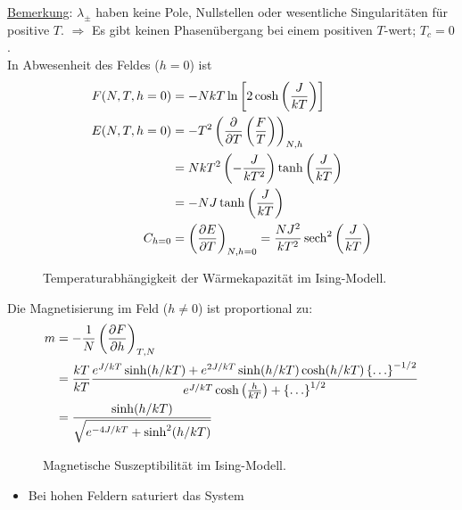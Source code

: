 \begin{enumerate}[A)]
    \underline{Bemerkung}: $\lambda_\pm$ haben keine Pole, Nullstellen oder wesentliche Singularitäten für positive $T$.
    $\Rightarrow$ Es gibt keinen Phasenübergang bei einem positiven $T$-wert; $T_c = 0$. \\
    In Abwesenheit des Feldes ($h=0$) ist
    \begin{equation}
        \begin{split}
            F(N, T, h=0) &= - N k T \ln \left[ 2 \cosh \left( \frac{J}{k T} \right) \right] \\
            E(N, T, h=0) &= - T^2 \left( \frac{\partial}{\partial T} \left( \frac{F}{T} \right)  \right)_{N, h} \\
            &= N k T^2 \left( - \frac{J}{k T^2} \right) \tanh \left( \frac{J}{k T} \right)  \\
            &= - N J \tanh \left( \frac{J}{k T} \right) \\
            C_{h=0} &= \left( \frac{\partial E}{\partial T} \right)_{N, h=0} = \frac{N J^2}{k T^2} \operatorname{sech}^2 \left( \frac{J}{k T} \right)
        \end{split}
    \end{equation}
    \begin{figure}[H]
        \centering
        \def\svgwidth{0.5\textwidth}
        
        \caption{Temperaturabhängigkeit der Wärmekapazität im Ising-Modell.}
        \label{img:IsingC_T}
\end{figure}
    Die Magnetisierung im Feld ($h \neq 0$) ist proportional zu:
    \begin{equation}
        \begin{split}
            m &= - \frac{1}{N} \left( \frac{\partial F}{\partial h} \right)_{T, N} \\
            &= \frac{k T}{k T} \frac{e^{J/kT} \sinh(h/kT) +e^{2J/kT} \sinh (h/kT) \cosh (h/kT) \left\{ \ldots \right\}^{-1/2}}{e^{J / k T} \cosh \left( \frac{h}{k T} \right) + \left\{ \ldots \right\}^{1/2}} \\
            &= \frac{\sinh (h / k T)}{\sqrt{e^{-4 J / k T} + \sinh^2 (h/k T)}}
        \end{split}
    \end{equation}
    \begin{figure}[H]
        \centering
        \def\svgwidth{0.6\textwidth}
        
        \caption{Magnetische Suszeptibilität im Ising-Modell.}
        \label{img:Isingm_T}
\end{figure}
    \begin{itemize}
        \item Bei hohen Feldern saturiert das System

\end{itemize}
\end{enumerate}
